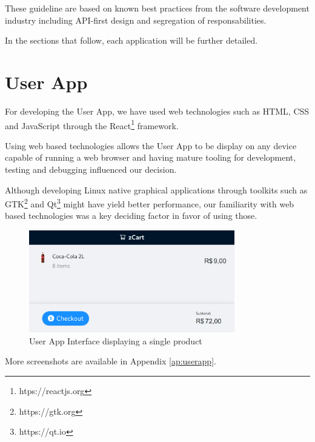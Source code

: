 \documentclass[openright]{normas-utf-tex} %
\begin{document}
These guideline are based on known best practices from the software development industry including API-first design and segregation of
responsabilities. \cite{Sam2021,Kong2022}

In the sections that follow, each application will be further detailed.

\section{User App}

For developing the User App, we have used web technologies such as HTML, CSS \cite{Duckett2011} and JavaScript \cite{Flanagan2020} through the 
React\footnote{htps://reactjs.org} framework. 

Using web based technologies allows the User App to be display on any device capable of running a web browser and
having mature tooling for development, testing and debugging influenced our decision.

Although developing Linux native graphical applications through toolkits such
as GTK\footnote{https://gtk.org} and Qt\footnote{https://qt.io} might have
yield better performance, our familiarity with web based technologies was a
key deciding factor in favor of using those.

\begin{figure}[H]
	\centering
	\includegraphics[width=0.8\textwidth]{./images/ui.png}
	\caption[User App Interface display a single product]{User App Interface displaying a single product}
	\label{fig:dummy}
\end{figure}

More screenshots are available in Appendix \ref{ap:userapp}.
\end{document}
